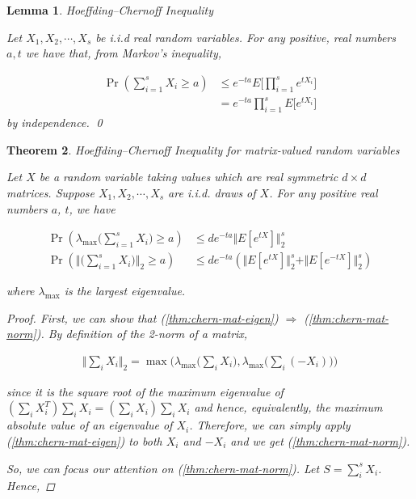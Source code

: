 \documentclass[11pt]{article}
\newcommand\0{\mathbf{0}}
\newcommand\<{\langle}
\renewcommand\>{\rangle}
\renewcommand\implies{\Rightarrow}
\newtheorem{theorem}{Theorem}[section]
\newtheorem{lemma}[theorem]{Lemma}
\begin{document}
\begin{lemma}Hoeffding--Chernoff Inequality
\label{lem:chernoff}

Let $X_1, X_2, \cdots, X_s$	be i.i.d real random variables. For any positive, real numbers $a, t$ we have that, from Markov's inequality,

\begin{align*}
\Pr(\sum_{i=1}^s X_i \geq a) &\leq e^{-ta} E\Bigg[\prod_{i=1}^s e^{tX_i}\Bigg]\\
&= e^{-ta} \prod_{i=1}^s E\Bigg[e^{tX_i}\Bigg]
\end{align*}
by independence.
\qed
\end{lemma}

\begin{theorem}Hoeffding--Chernoff Inequality for matrix-valued random variables \cite{kannan2017randomized}
	
	Let $X$ be a random variable taking values which are real symmetric $d \times d$ matrices. Suppose $X_1, X_2, \cdots , X_s$ are i.i.d. draws of $X$. For any positive real numbers $a$, $t$, we have
	
	\begin{align}
		\label{thm:chern-mat-eigen}
		\Pr(\lambda_{\max}\Big(\sum_{i=1}^s X_i\Big) \geq a ) &\leq de^{-ta} \Vert E[e^{tX}]\Vert_2^s \\
		\label{thm:chern-mat-norm}
		\Pr(\Big\Vert \Big(\sum_{i=1}^s X_i\Big)\Big\Vert_2 \geq a ) &\leq de^{-ta} (\Vert E[e^{tX}]\Vert_2^s + \Vert E[e^{-tX}]\Vert_2^s)
	\end{align}
	
	where $\lambda_{\max}$ is the largest eigenvalue.
	\begin{proof}
		First, we can show that (\ref{thm:chern-mat-eigen}) $\implies$ (\ref{thm:chern-mat-norm}). By definition of the 2-norm of a matrix,
		
		\begin{align*}
		\Vert \sum_i X_i \Vert_2 = \max\Big(\lambda_{\max} \Big(\sum_i X_i\Big), \lambda_{\max} \Big(\sum_i (-X_i)\Big)\Big)	
		\end{align*}
		
		since it is the square root of the maximum eigenvalue of $(\sum_i X_i^T) \sum_i X_i = (\sum_i X_i) \sum_i X_i$ and hence, equivalently, the maximum absolute value of an eigenvalue of $X_i$. Therefore, we can simply apply (\ref{thm:chern-mat-eigen}) to both $X_i$ and $-X_i$ and we get (\ref{thm:chern-mat-norm}).
		
		So, we can focus our attention on (\ref{thm:chern-mat-norm}). Let $S = \sum_i^s X_i$. Hence,
		

\end{proof}
\end{theorem}
\end{document}
